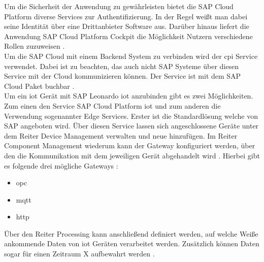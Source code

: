 \noindent Um die Sicherheit der Anwendung zu gewährleisten bietet die SAP Cloud Platform diverse Services zur Authentifizierung. In der Regel weißt man dabei seine Identität über eine Drittanbieter Software aus. Darüber hinaus liefert die Anwendung SAP Cloud Platform Cockpit die Möglichkeit Nutzern verschiedene Rollen zuzuweisen \cite[Seite 176ff]{Holtschulte20:IOS}.\\

\noindent Um die SAP Cloud mit einem Backend System zu verbinden wird der \ac{cpi}  Service verwendet. Dabei ist zu beachten, das auch nicht SAP Systeme über diesen Service mit der Cloud kommunizieren können. Der Service ist mit dem SAP Cloud Paket buchbar \cite[Seite 146]{Holtschulte20:IOS}.\\

\noindent Um ein \ac{iot} Gerät mit SAP Leonardo \ac{iot} anzubinden gibt es zwei Möglichkeiten. Zum einen den Service SAP Cloud Platform \ac{iot} und zum anderen die Verwendung sogenannter Edge Services. Erster ist die Standardlösung welche von SAP angeboten wird. Über diesen Service lassen sich angeschlossene Geräte unter dem Reiter Device Management verwalten und neue hinzufügen. Im Reiter Component Management wiederum kann der Gateway konfiguriert werden, über den die Kommunikation mit dem jeweiligen Gerät abgehandelt wird \cite[Seite 200f]{Holtschulte20:IOS}. Hierbei gibt es folgende drei mögliche Gateways \cite[Seite 117]{Holtschulte20:IOS}:
\begin{itemize}
	\item{\ac{opc}}
	\item{\ac{mqtt}}
	\item{\ac{http}}
\end{itemize}
Über den Reiter Processing kann anschließend definiert werden, auf welche Weiße ankommende Daten von \ac{iot} Geräten verarbeitet werden. Zusätzlich können Daten sogar für einen Zeitraum X aufbewahrt werden \cite[Seite 205]{Holtschulte20:IOS}.\\

